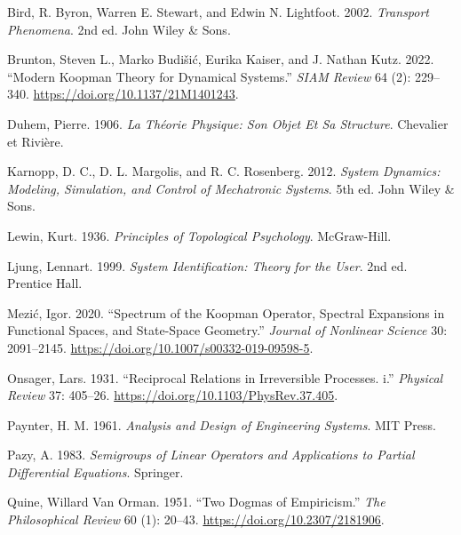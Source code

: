 \documentclass[
  letterpaper,
  DIV=11,
  numbers=noendperiod]{scrartcl}
\newlength{\cslhangindent}
\newenvironment{CSLReferences}[2] %
 {\begin{list}{}{%
  \setlength{\itemindent}{0pt}
  \setlength{\leftmargin}{0pt}
  \setlength{\parsep}{0pt}
  \ifodd #1
   \setlength{\leftmargin}{\cslhangindent}
   \setlength{\itemindent}{-1\cslhangindent}
  \fi
  \setlength{\itemsep}{#2\baselineskip}}}
 {\end{list}}
\begin{document}
\label{refs}
\begin{CSLReferences}{1}{0}
Bird, R. Byron, Warren E. Stewart, and Edwin N. Lightfoot. 2002.
\emph{Transport Phenomena}. 2nd ed. John Wiley \& Sons.

Brunton, Steven L., Marko Budišić, Eurika Kaiser, and J. Nathan Kutz.
2022. {``Modern {K}oopman Theory for Dynamical Systems.''} \emph{SIAM
Review} 64 (2): 229--340. \url{https://doi.org/10.1137/21M1401243}.

Duhem, Pierre. 1906. \emph{La Théorie Physique: Son Objet Et Sa
Structure}. Chevalier et Rivière.

Karnopp, D. C., D. L. Margolis, and R. C. Rosenberg. 2012. \emph{System
Dynamics: Modeling, Simulation, and Control of Mechatronic Systems}. 5th
ed. John Wiley \& Sons.

Lewin, Kurt. 1936. \emph{Principles of Topological Psychology}.
McGraw-Hill.

Ljung, Lennart. 1999. \emph{System Identification: Theory for the User}.
2nd ed. Prentice Hall.

Mezić, Igor. 2020. {``Spectrum of the {K}oopman Operator, Spectral
Expansions in Functional Spaces, and State-Space Geometry.''}
\emph{Journal of Nonlinear Science} 30: 2091--2145.
\url{https://doi.org/10.1007/s00332-019-09598-5}.

Onsager, Lars. 1931. {``Reciprocal Relations in Irreversible Processes.
i.''} \emph{Physical Review} 37: 405--26.
\url{https://doi.org/10.1103/PhysRev.37.405}.

Paynter, H. M. 1961. \emph{Analysis and Design of Engineering Systems}.
MIT Press.

Pazy, A. 1983. \emph{Semigroups of Linear Operators and Applications to
Partial Differential Equations}. Springer.

Quine, Willard Van Orman. 1951. {``Two Dogmas of Empiricism.''}
\emph{The Philosophical Review} 60 (1): 20--43.
\url{https://doi.org/10.2307/2181906}.

\end{CSLReferences}
\end{document}
